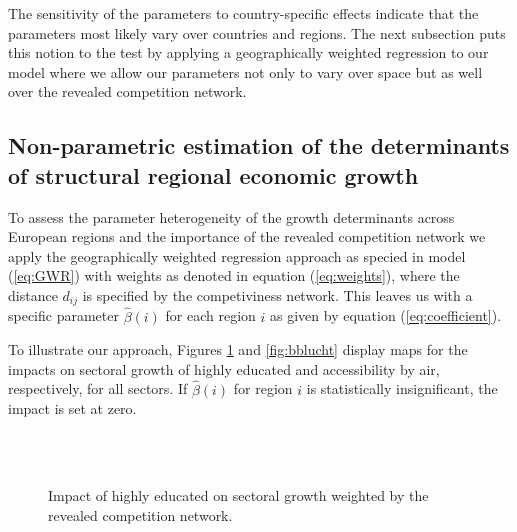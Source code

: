 \documentclass[11pt,parskip,abstracton,notitlepage, paper=a4]{scrartcl}
\begin{document}
The sensitivity of the parameters to country-specific effects indicate that the parameters most likely vary over countries and regions. The next subsection puts this notion to the test by applying a geographically weighted regression to our model where we allow our parameters not only to vary over space but as well over the revealed competition network.

\subsection{Non-parametric estimation of the determinants of structural regional economic growth}

To assess the parameter heterogeneity of the growth determinants across European regions and the importance of the revealed competition network we apply the geographically weighted regression approach as specied in model (\ref{eq:GWR}) with weights as denoted in equation (\ref{eq:weights}), where the distance $d_{ij}$ is specified by the competiviness network. This leaves us with a specific parameter $\hat{\beta}(i)$ for each region $i$ as given by equation (\ref{eq:coefficient}).

To illustrate our approach, Figures \ref{fig:highedu} and \ref{fig:bblucht} display maps for the impacts on sectoral growth of highly educated and accessibility by air, respectively, for all sectors. If $\hat{\beta}(i)$ for region $i$ is statistically insignificant, the impact is set at zero.

\begin{figure}
	\centering
	\\
	\\
	\caption{Impact of highly educated on sectoral growth weighted by the revealed competition network.}
	\label{fig:highedu}
\end{figure}
\end{document}
